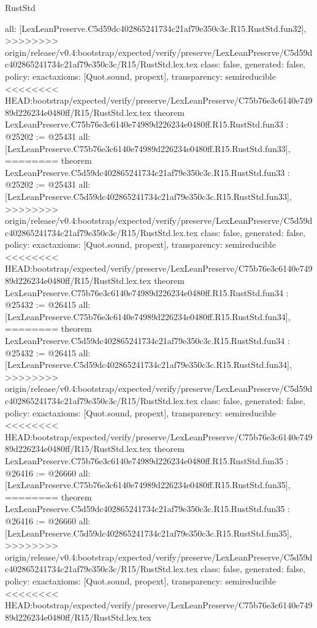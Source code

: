 \begin{lexlean}{RustStd}
\begin{coremodule}
{\begin{coremodule}
{{{{{{{{{{{{{{{{{{{{{{{{{{{{{{{{{{{{  all: [LexLeanPreserve.C5d59dc402865241734c21af79e350c3c.R15.RustStd.fun32],
>>>>>>>> origin/release/v0.4:bootstrap/expected/verify/preserve/LexLeanPreserve/C5d59dc402865241734c21af79e350c3c/R15/RustStd.lex.tex
  class: false,
  generated: false,
  policy: exact{axioms: [Quot.sound, propext]},
  transparency: semireducible
}
<<<<<<<< HEAD:bootstrap/expected/verify/preserve/LexLeanPreserve/C75b76e3c6140e74989d226234e0480ff/R15/RustStd.lex.tex
theorem LexLeanPreserve.C75b76e3c6140e74989d226234e0480ff.R15.RustStd.fun33 : @25202 := @25431 {
  all: [LexLeanPreserve.C75b76e3c6140e74989d226234e0480ff.R15.RustStd.fun33],
========
theorem LexLeanPreserve.C5d59dc402865241734c21af79e350c3c.R15.RustStd.fun33 : @25202 := @25431 {
  all: [LexLeanPreserve.C5d59dc402865241734c21af79e350c3c.R15.RustStd.fun33],
>>>>>>>> origin/release/v0.4:bootstrap/expected/verify/preserve/LexLeanPreserve/C5d59dc402865241734c21af79e350c3c/R15/RustStd.lex.tex
  class: false,
  generated: false,
  policy: exact{axioms: [Quot.sound, propext]},
  transparency: semireducible
}
<<<<<<<< HEAD:bootstrap/expected/verify/preserve/LexLeanPreserve/C75b76e3c6140e74989d226234e0480ff/R15/RustStd.lex.tex
theorem LexLeanPreserve.C75b76e3c6140e74989d226234e0480ff.R15.RustStd.fun34 : @25432 := @26415 {
  all: [LexLeanPreserve.C75b76e3c6140e74989d226234e0480ff.R15.RustStd.fun34],
========
theorem LexLeanPreserve.C5d59dc402865241734c21af79e350c3c.R15.RustStd.fun34 : @25432 := @26415 {
  all: [LexLeanPreserve.C5d59dc402865241734c21af79e350c3c.R15.RustStd.fun34],
>>>>>>>> origin/release/v0.4:bootstrap/expected/verify/preserve/LexLeanPreserve/C5d59dc402865241734c21af79e350c3c/R15/RustStd.lex.tex
  class: false,
  generated: false,
  policy: exact{axioms: [Quot.sound, propext]},
  transparency: semireducible
}
<<<<<<<< HEAD:bootstrap/expected/verify/preserve/LexLeanPreserve/C75b76e3c6140e74989d226234e0480ff/R15/RustStd.lex.tex
theorem LexLeanPreserve.C75b76e3c6140e74989d226234e0480ff.R15.RustStd.fun35 : @26416 := @26660 {
  all: [LexLeanPreserve.C75b76e3c6140e74989d226234e0480ff.R15.RustStd.fun35],
========
theorem LexLeanPreserve.C5d59dc402865241734c21af79e350c3c.R15.RustStd.fun35 : @26416 := @26660 {
  all: [LexLeanPreserve.C5d59dc402865241734c21af79e350c3c.R15.RustStd.fun35],
>>>>>>>> origin/release/v0.4:bootstrap/expected/verify/preserve/LexLeanPreserve/C5d59dc402865241734c21af79e350c3c/R15/RustStd.lex.tex
  class: false,
  generated: false,
  policy: exact{axioms: [Quot.sound, propext]},
  transparency: semireducible
}
<<<<<<<< HEAD:bootstrap/expected/verify/preserve/LexLeanPreserve/C75b76e3c6140e74989d226234e0480ff/R15/RustStd.lex.tex
}}}}}}}}}}}}}}}}}}}}}}}}}}}}}}}}}}}}}}
\end{coremodule}}
\end{coremodule}
\end{lexlean}
